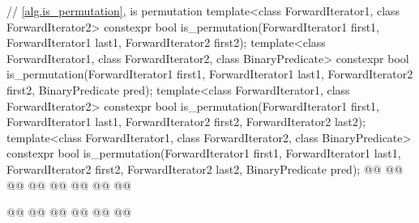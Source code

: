 \begin{codeblock}
{  // \ref{alg.is_permutation}, is permutation
  template<class ForwardIterator1, class ForwardIterator2>
    constexpr bool is_permutation(ForwardIterator1 first1, ForwardIterator1 last1,
                                  ForwardIterator2 first2);
  template<class ForwardIterator1, class ForwardIterator2, class BinaryPredicate>
    constexpr bool is_permutation(ForwardIterator1 first1, ForwardIterator1 last1,
                                  ForwardIterator2 first2, BinaryPredicate pred);
  template<class ForwardIterator1, class ForwardIterator2>
    constexpr bool is_permutation(ForwardIterator1 first1, ForwardIterator1 last1,
                                  ForwardIterator2 first2, ForwardIterator2 last2);
  template<class ForwardIterator1, class ForwardIterator2, class BinaryPredicate>
    constexpr bool is_permutation(ForwardIterator1 first1, ForwardIterator1 last1,
                                  ForwardIterator2 first2, ForwardIterator2 last2,
                                  BinaryPredicate pred);
  @@
    @@
        @@
        @@
      @@
      @@
                          @@
                          @@

    @@
        @@
      @@
      @@
                          @@
  @\added{\}}@

}
\end{codeblock}
